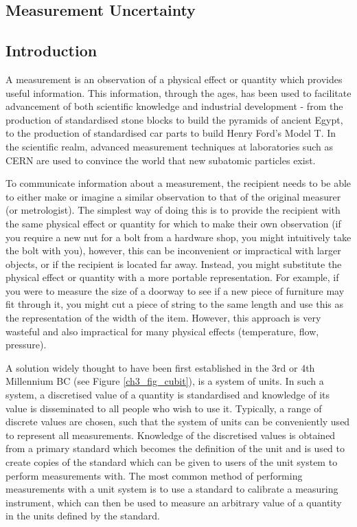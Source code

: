 \documentclass[../thesis/thesis.tex]{subfiles}
\begin{document}
	
\onlyinsubfile{\setcounter{chapter}{2}}

\begin{refsection}
\chapter{Measurement Uncertainty}
\section{Introduction}

A measurement is an observation of a physical effect or quantity which provides useful information. This information, through the ages, has been used to facilitate advancement of both scientific knowledge and industrial development - from the production of standardised stone blocks to build the pyramids of ancient Egypt, to the production of standardised car parts to build Henry Ford's Model T. In the scientific realm, advanced measurement techniques at laboratories such as CERN are used to convince the world that new subatomic particles exist.

To communicate information about a measurement, the recipient needs to be able to either make or imagine a similar observation to that of the original measurer (or metrologist). The simplest way of doing this is to provide the recipient with the same physical effect or quantity for which to make their own observation (if you require a new nut for a bolt from a hardware shop, you might intuitively take the bolt with you), however, this can be inconvenient or impractical with larger objects, or if the recipient is located far away. Instead, you might substitute the physical effect or quantity with a more portable representation. For example, if you were to measure the size of a doorway to see if a new piece of furniture may fit through it, you might cut a piece of string to the same length and use this as the representation of the width of the item. However, this approach is very wasteful and also impractical for many physical effects (temperature, flow, pressure).

A solution widely thought to have been first established in the 3rd or 4th Millennium BC (see Figure \ref{ch3_fig_cubit}), is a system of units. In such a system, a discretised value of a quantity is standardised and knowledge of its value is disseminated to all people who wish to use it. Typically, a range of discrete values are chosen, such that the system of units can be conveniently used to represent all measurements. Knowledge of the discretised values is obtained from a primary standard which becomes the definition of the unit and is used to create copies of the standard which can be given to users of the unit system to perform measurements with. The most common method of performing measurements with a unit system is to use a standard to calibrate a measuring instrument, which can then be used to measure an arbitrary value of a quantity in the units defined by the standard.


\end{refsection}
\end{document}
